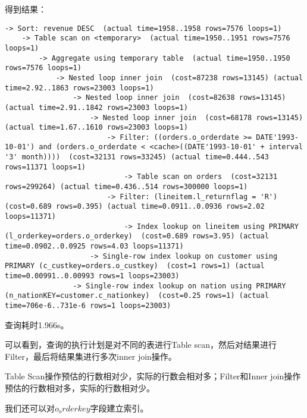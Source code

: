 \documentclass{article}
\begin{document}
得到结果：

\begin{lstlisting}
-> Sort: revenue DESC  (actual time=1958..1958 rows=7576 loops=1)
    -> Table scan on <temporary>  (actual time=1950..1951 rows=7576 loops=1)
        -> Aggregate using temporary table  (actual time=1950..1950 rows=7576 loops=1)
            -> Nested loop inner join  (cost=87238 rows=13145) (actual time=2.92..1863 rows=23003 loops=1)
                -> Nested loop inner join  (cost=82638 rows=13145) (actual time=2.91..1842 rows=23003 loops=1)
                    -> Nested loop inner join  (cost=68178 rows=13145) (actual time=1.67..1610 rows=23003 loops=1)
                        -> Filter: ((orders.o_orderdate >= DATE'1993-10-01') and (orders.o_orderdate < <cache>((DATE'1993-10-01' + interval '3' month))))  (cost=32131 rows=33245) (actual time=0.444..543 rows=11371 loops=1)
                            -> Table scan on orders  (cost=32131 rows=299264) (actual time=0.436..514 rows=300000 loops=1)
                        -> Filter: (lineitem.l_returnflag = 'R')  (cost=0.689 rows=0.395) (actual time=0.0911..0.0936 rows=2.02 loops=11371)
                            -> Index lookup on lineitem using PRIMARY (l_orderkey=orders.o_orderkey)  (cost=0.689 rows=3.95) (actual time=0.0902..0.0925 rows=4.03 loops=11371)
                    -> Single-row index lookup on customer using PRIMARY (c_custkey=orders.o_custkey)  (cost=1 rows=1) (actual time=0.00991..0.00993 rows=1 loops=23003)
                -> Single-row index lookup on nation using PRIMARY (n_nationKEY=customer.c_nationkey)  (cost=0.25 rows=1) (actual time=706e-6..731e-6 rows=1 loops=23003)
\end{lstlisting}

查询耗时1.966s。

可以看到，查询的执行计划是对不同的表进行Table scan，然后对结果进行Filter，最后将结果集进行多次inner join操作。

Table Scan操作预估的行数相对少，实际的行数会相对多；Filter和Inner join操作预估的行数相对多，实际的行数相对少。

我们还可以对$o_orderkey$字段建立索引。
\end{document}
